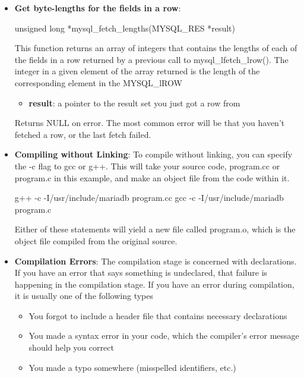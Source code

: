 \documentclass{report}
\begin{document}
\begin{itemize}
        \item \textbf{Get byte-lengths for the fields in a row}:
            \bigbreak \noindent 
            \begin{cppcode}
            unsigned long *mysql_fetch_lengths(MYSQL_RES *result)
            \end{cppcode}
            \bigbreak \noindent 
            This function returns an array of integers that contains the lengths of each of the fields in a row returned by a previous call to mysql\_lfetch\_lrow(). The integer in a given element of the array returned is the length of the corresponding element in the MYSQL\_lROW
            \bigbreak \noindent 
            \begin{itemize}
                \item \textbf{result}:  a pointer to the result set you just got a row from
            \end{itemize}
            \bigbreak \noindent 
            Returns NULL on error. The most common error will be that you haven’t fetched a row, or the last fetch failed.
        \item \textbf{Compiling without Linking}: To compile without linking, you can specify the -c flag to gcc or g++. This will take your source code, program.cc or program.c in this example, and make an object file from the code within it.
            \bigbreak \noindent 
            \begin{cppcode}
                g++ -c -I/usr/include/mariadb program.cc
                gcc -c -I/usr/include/mariadb program.c
            \end{cppcode}
            \bigbreak \noindent 
            Either of these statements will yield a new file called program.o, which is the object file compiled from the original source.
        \item \textbf{Compilation Errors}: The compilation stage is concerned with declarations. If you have an error that says something is undeclared, that failure is happening in the compilation stage.
            \bigbreak \noindent 
            If you have an error during compilation, it is usually one of the following types
            \begin{itemize}
                \item You forgot to include a header file that contains necessary declarations
                \item You made a syntax error in your code, which the compiler’s error message should help you correct
                \item You made a typo somewhere (misspelled identifiers, etc.)

\end{itemize}
\end{itemize}
\end{document}
